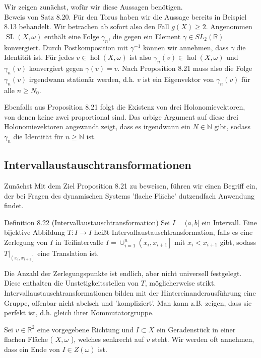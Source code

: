 \documentclass[10pt, letterpaper]{article}
\begin{document}
Wir zeigen zunächst, wofür wir diese Aussagen benötigen.\\
Beweis von Satz 8.20. Für den Torus haben wir die Aussage bereits in Beispiel 8.13 behandelt. Wir betrachen ab sofort also den Fall $g(X) \geq 2$. Angenommen $\operatorname{SL}(X, \omega)$ enthält eine Folge $\gamma_{n}$, die gegen ein Element $\gamma \in S L_{2}(\mathbb{R})$ konvergiert. Durch Postkomposition mit $\gamma^{-1}$ können wir annehmen, dass $\gamma$ die Identität ist. Für jedes $v \in \operatorname{hol}(X, \omega)$ ist also $\gamma_{n}(v) \in \operatorname{hol}(X, \omega)$ und $\gamma_{n}(v)$ konvergiert gegen $\gamma(v)=v$. Nach Proposition 8.21 muss also die Folge $\gamma_{n}(v)$ irgendwann stationär werden, d.h. $v$ ist ein Eigenvektor von $\gamma_{n}(v)$ für alle $n \geq N_{0}$.

Ebenfalls aus Proposition 8.21 folgt die Existenz von drei Holonomievektoren, von denen keine zwei proportional sind. Das orbige Argument auf diese drei Holonomievektoren angewandt zeigt, dass es irgendwann ein $N \in \mathbb{N}$ gibt, sodass $\gamma_{n}$ die Identität für $n \geq \mathbb{N}$ ist.

\subsection {Intervallaustauschtransformationen}
Zunächst Mit dem Ziel Proposition 8.21 zu beweisen, führen wir einen Begriff ein, der bei Fragen des dynamischen Systems 'flache Fläche' dutzendfach Anwendung findet.

Definition 8.22 (Intervallaustauschtransformation) Sei $I=(a, b]$ ein Intervall. Eine bijektive Abbildung $T: I \rightarrow I$ heißt Intervallaustauschtransformation, falls es eine Zerlegung von $I$ in Teilintervalle $I=\cup_{i=1}^{n}\left(x_{i}, x_{i+1}\right]$ mit $x_{i}<x_{i+1}$ gibt, sodass $\left.T\right|_{\left(x_{i}, x_{i+1}\right]}$ eine Translation ist.

Die Anzahl der Zerlegungspunkte ist endlich, aber nicht universell festgelegt. Diese enthalten die Unstetigkeitsstellen von $T$, möglicherweise strikt. Intervallaustauschtransformationen bilden mit der Hintereinanderausführung eine Gruppe, offenbar nicht abelsch und 'kompliziert'. Man kann z.B. zeigen, dass sie perfekt ist, d.h. gleich ihrer Kommutatorgruppe.

Sei $v \in \mathbb{R}^{2}$ eine vorgegebene Richtung und $I \subset X$ ein Geradenstück in einer flachen Fläche ( $X, \omega$ ), welches senkrecht auf $v$ steht. Wir werden oft annehmen, dass ein Ende von $I \in Z(\omega)$ ist.
\end{document}
